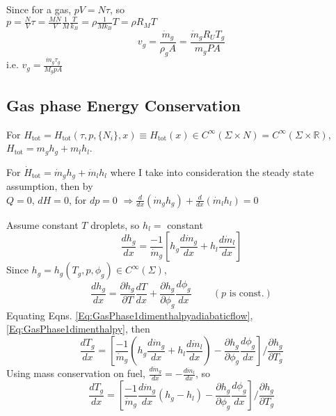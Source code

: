 \documentclass[10pt]{amsart}
\begin{document}
\begin{multicols*}{2}
Since for a gas, $pV=N\tau$, so \\
$p=\frac{N}{V} \tau = \frac{MN}{V} \frac{1}{M} \frac{T}{k_B}  =\rho \frac{1}{Mk_B}T = \rho R_M T$
\begin{equation}
  \boxed{ v_g = \frac{\dot{m}_g}{\rho_g A } = \frac{ \dot{m}_g R_U T_g}{ m_g PA} }
\end{equation}
i.e. $v_g = \frac{ \dot{m}_g \tau_g}{ M_g pA }$


\subsection{Gas phase Energy Conservation}

For $H_{\text{tot}} = H_{\text{tot}}(\tau,p,\lbrace N_i \rbrace , x) \equiv H_{\text{tot}}(x) \in C^{\infty}(\Sigma \times N) = C^{\infty}(\Sigma\times \mathbb{R})$, $H_{\text{tot}} = m_g h_g + m_l h_l$.  

For $\dot{H}_{\text{tot}} = \dot{m}_gh_g + \dot{m}_l h_l$ where I take into consideration the steady state assumption, then by \\
$Q =0$, $dH=0$, for $dp=0$ $\Longrightarrow \frac{d}{dx}(\dot{m}_g h_g ) + \frac{d}{dx}(\dot{m}_l h_l) =0$

Assume constant $T$ droplets, so $h_l =$ constant
\begin{equation}\label{Eq:GasPhase1dimenthalpyadiabaticflow}
\frac{dh_g}{dx} = \frac{-1}{\dot{m}_g} \left[ h_g \frac{d\dot{m}_g}{dx} + h_l \frac{d\dot{m}_l }{dx} \right]
\end{equation}
Since $h_g = h_g(T_g, p , \phi_g) \in C^{\infty}(\Sigma)$, 
\begin{equation}\label{Eq:GasPhase1dimenthalpy}
\frac{dh_g}{dx} = \frac{ \partial h_g}{ \partial T} \frac{dT}{dx} + \frac{ \partial h_g}{\partial \phi_g} \frac{d\phi_g}{dx} \qquad \, (\text{$p$ is const.})
\end{equation}
Equating Eqns. \ref{Eq:GasPhase1dimenthalpyadiabaticflow}, \ref{Eq:GasPhase1dimenthalpy}, then
\[
\frac{dT_g}{dx} = \left[ \frac{-1}{\dot{m}_g} \left( h_g \frac{d\dot{m}_g}{dx} + h_l \frac{d\dot{m}_l}{dx} \right) - \frac{ \partial h_g}{ \partial \phi_g} \frac{d\phi_g}{dx} \right]/\frac{ \partial h_g}{\partial T_g}
\]
Using mass conservation on fuel, $\frac{d\dot{m}_g}{dx} = -\frac{d\dot{m}_l}{dx}$, so
\begin{equation}
\boxed{ \frac{dT_g}{dx}= \left[ \frac{-1}{\dot{m}_g} \frac{d\dot{m}_g}{dx}(h_g - h_l) - \frac{\partial h_g}{ \partial \phi_g} \frac{d\phi_g}{dx} \right]/\frac{ \partial h_g}{ \partial T_g} }
\end{equation}




\end{multicols*}
\end{document}
